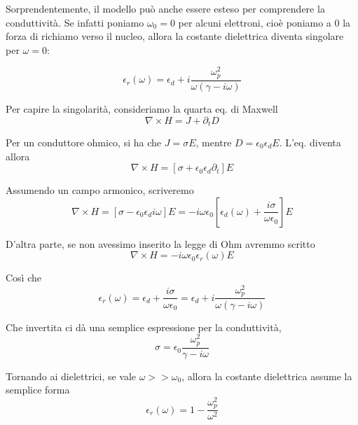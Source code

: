 \documentclass{report}
\begin{document}
Sorprendentemente, il modello può anche essere esteso per comprendere la conduttività. Se infatti poniamo $\omega_0 = 0 $ per alcuni elettroni, cioè poniamo a $0$ la forza di richiamo verso il nucleo, allora la costante dielettrica diventa singolare per $\omega = 0$: 

\begin{equation}
    \epsilon_r(\omega) = \epsilon_d + i\frac{\omega_p^2}{\omega(\gamma - i\omega)}
\end{equation}

Per capire la singolarità, consideriamo la quarta eq. di Maxwell
\begin{equation}
    \nabla \times H = J + \partial_t D
\end{equation}

Per un conduttore ohmico, si ha che $J = \sigma E$, mentre $D = \epsilon_0 \epsilon_d E$. L'eq. diventa allora 
\begin{equation}
    \nabla \times H = \left[\sigma + \epsilon_0 \epsilon_d\partial_t\right]E
\end{equation}

Assumendo un campo armonico, scriveremo 
\begin{equation}
    \nabla \times H = \left[\sigma - \epsilon_0\epsilon_d i\omega\right]E = -i\omega \epsilon_0 \left[\epsilon_d(\omega) + \frac{i\sigma}{\omega \epsilon_0}\right]E
\end{equation}

D'altra parte, se non avessimo inserito la legge di Ohm avremmo scritto
\begin{equation}
    \nabla \times H = -i\omega \epsilon_0 \epsilon_r(\omega)E
\end{equation}

Così che 
\begin{equation}
    \epsilon_r(\omega) = \epsilon_d + \frac{i\sigma}{\omega\epsilon_0} = \epsilon_d + i\frac{\omega_p^2}{\omega(\gamma - i\omega)}
\end{equation}

Che invertita ci dà una semplice espressione per la conduttività, 
\begin{equation}
    \sigma = \epsilon_0 \frac{\omega_p^2}{\gamma - i\omega}
\end{equation}

Tornando ai dielettrici, se vale $\omega >> \omega_0$, allora la costante dielettrica assume la semplice forma 
\begin{equation}
    \epsilon_r(\omega) = 1 - \frac{\omega_p^2}{\omega^2}
\end{equation}
\end{document}

